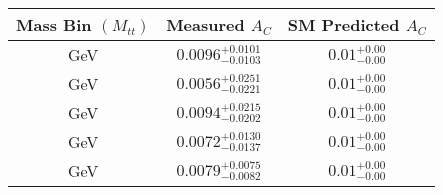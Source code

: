 \begin{tabular}{|c|c|c|} 
\hline
Mass Bin $(M_{tt})$ & Measured $A_C$ & SM Predicted $A_C$ \\ 
\hline
[1000,1500] GeV & $0.0096^{+0.0101}_{-0.0103}$ & $0.01^{+0.00}_{-0.00}$ \\ 
[0,500] GeV & $0.0056^{+0.0251}_{-0.0221}$ & $0.01^{+0.00}_{-0.00}$ \\ 
[1500,Inf] GeV & $0.0094^{+0.0215}_{-0.0202}$ & $0.01^{+0.00}_{-0.00}$ \\ 
[500,750] GeV & $0.0072^{+0.0130}_{-0.0137}$ & $0.01^{+0.00}_{-0.00}$ \\ 
[750,1000] GeV & $0.0079^{+0.0075}_{-0.0082}$ & $0.01^{+0.00}_{-0.00}$ \\ 
\hline
\end{tabular}